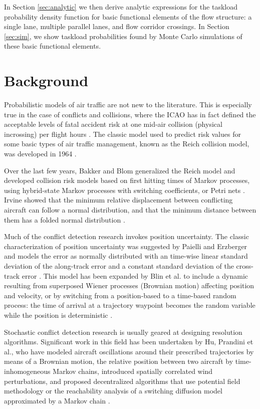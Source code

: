\documentclass[conference]{IEEEtran}
\begin{document}
In Section \ref{sec:analytic} we then derive analytic expressions for the taskload probability density function for basic functional elements of the flow structure: a single lane, multiple parallel lanes, and flow corridor crossings. In Section \ref{sec:sim}, we show taskload probabilities found by Monte Carlo simulations of these basic functional elements.

\section{Background}

Probabilistic models of air traffic are not new to the literature. This is especially true in the case of conflicts and collisions, where the ICAO has in fact defined the acceptable levels of fatal accident risk at one mid-air collision (physical incrossing) per  flight hours \cite{ICAO98}. The classic model used to predict risk values for some basic types of air traffic management, known as the Reich collision model, was developed in 1964 \cite{Rei64}.

Over the last few years, Bakker and Blom generalized the Reich model and developed collision risk models based on first hitting times of Markov processes, using hybrid-state Markov processes with switching coefficients, or Petri nets \cite{Blo06}. Irvine showed that the minimum relative displacement between conflicting aircraft can follow a normal distribution, and that the minimum distance between them has a folded normal distribution \cite{Irv01}.

Much of the conflict detection research invokes position uncertainty. The classic characterization of position uncertainty was suggested by Paielli and Erzberger and models the error as normally distributed with an time-wise linear standard deviation of the along-track error and a constant standard deviation of the cross-track error \cite{PaielliErzberger:1997}. This model has been expanded by Blin et al. to include a dynamic resulting from superposed Wiener processes (Brownian motion) affecting position and velocity, or by switching from a position-based to a time-based random process: the time of arrival at a trajectory waypoint becomes the random variable while the position is deterministic \cite{Blin}.

Stochastic conflict detection research is usually geared at designing resolution algorithms. Significant work in this field has been undertaken by Hu, Prandini et al., who have modeled aircraft oscillations around their prescribed trajectories by means of a Brownian motion, the relative position between two aircraft by time-inhomogeneous Markov chains, introduced spatially correlated wind perturbations, and proposed decentralized algorithms that use potential field methodology or the reachability analysis of a switching diffusion model approximated by a Markov chain \cite{Pra08}. 
\end{document}
